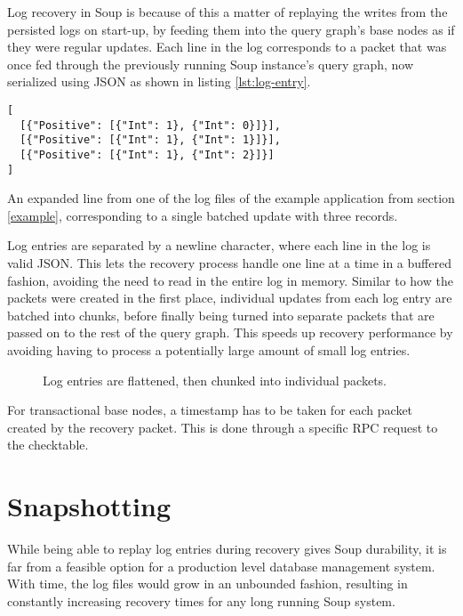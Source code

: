 \documentclass[b5paper]{report}
\begin{document}
Log recovery in Soup is because of this a matter of replaying the writes from
the persisted logs on start-up, by feeding them into the query graph's base
nodes as if they were regular updates. Each line in the log corresponds to a
packet that was once fed through the previously running Soup instance's query
graph, now serialized using JSON as shown in listing \ref{lst:log-entry}.

\begin{listing}[H]
  \begin{verbatim}
[
  [{"Positive": [{"Int": 1}, {"Int": 0}]}],
  [{"Positive": [{"Int": 1}, {"Int": 1}]}],
  [{"Positive": [{"Int": 1}, {"Int": 2}]}]
]
  \end{verbatim}
  \caption{
    An expanded line from one of the log files of the example application from section
    \ref{example}, corresponding to a single batched update with three records.
    \label{lst:log-entry}
  }
\end{listing}

Log entries are separated by a newline character, where each line in the log
is valid JSON. This lets the recovery process handle one line at a time in a
buffered fashion, avoiding the need to read in the entire log in memory. Similar
to how the packets were created in the first place, individual updates from
each log entry are batched into chunks, before finally being turned into
separate packets that are passed on to the rest of the query graph. This speeds
up recovery performance by avoiding having to process a potentially large
amount of small log entries.

\begin{figure}[H]
  
  \caption{
    Log entries are flattened, then chunked into individual packets.
    \label{log-chunking}
  }
\end{figure}

For transactional base nodes, a timestamp has to be taken for each packet
created by the recovery packet. This is done through a specific RPC request to the
checktable.

\section{Snapshotting}
While being able to replay log entries during recovery
gives Soup durability, it is far from a feasible option for a production level
database management system. With time, the log files would grow in an unbounded
fashion, resulting in constantly increasing recovery times for any long running
Soup system.
\end{document}
